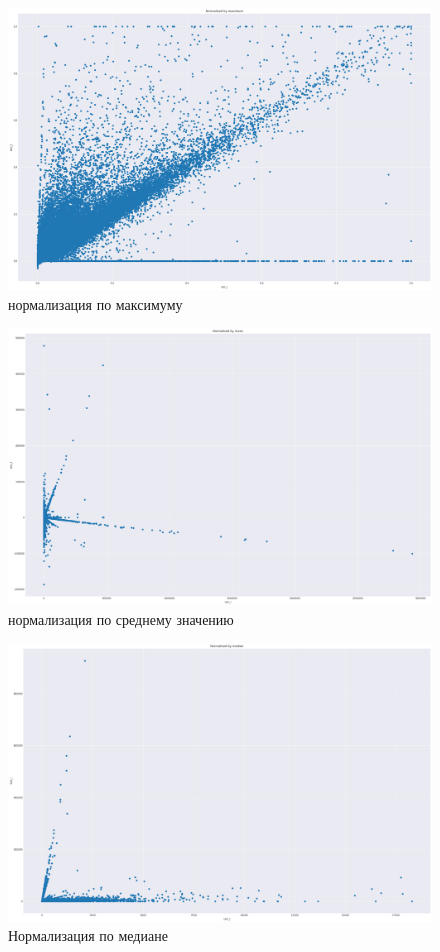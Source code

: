 \documentclass{article}
\begin{document}
\begin{figure}[!htp]
\includegraphics[width=\linewidth]{imgs/dist_max.png}
  \caption{нормализация по максимуму}\label{fig:dist_max}
\end{figure}

\begin{figure}[!htp]
\includegraphics[width=\linewidth]{imgs/dist_mean.png}
  \caption{нормализация по среднему значению}\label{fig:dist_mean}
\end{figure}

\begin{figure}[!htp]
\includegraphics[width=\linewidth]{imgs/dist_med.png}
  \caption{Нормализация по медиане}\label{fig:dist_med}
\end{figure}
\end{document}
